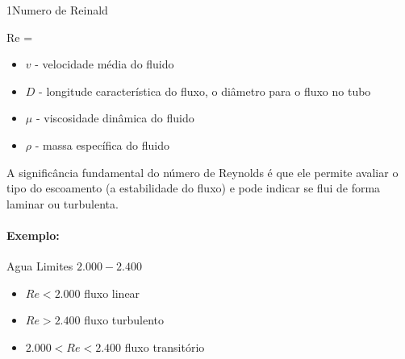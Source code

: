 \documentclass[\mainfilename]{subfiles}
\begin{document}
\begin{sectionBox}1{Numero de Reinald} %
    
    \begin{BM}
        Re = 
    \end{BM}

    \begin{itemize}
        \item \(v\) - velocidade média do fluido
        \item \({\displaystyle D}\) - longitude característica do fluxo, o diâmetro para o fluxo no tubo
        \item \(\mu\)  - viscosidade dinâmica do fluido
        \item \(\rho\)  - massa específica do fluido
    \end{itemize}

    A significância fundamental do número de Reynolds é que ele permite avaliar o tipo do escoamento (a estabilidade do fluxo) e pode indicar se flui de forma laminar ou turbulenta.

    \paragraph*{Exemplo:} Agua
    Limites \(2.000-2.400\)
    \begin{itemize}
        \item \(Re<2.000\) fluxo linear
        \item \(Re>2.400\) fluxo turbulento
        \item \(2.000<Re<2.400\) fluxo transitório
    \end{itemize}
    
\end{sectionBox}
\end{document}
